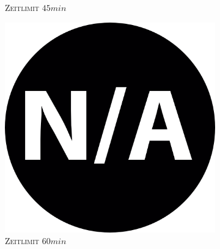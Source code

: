 \begin{figure}[H]
\begin{subfigure}[b]{0.3\textwidth}
\caption{\textsc{Zeitlimit} $45min$}
\label{fig:instance_coverage_b=3_l_b}
\end{subfigure}
\hfill
\begin{subfigure}[b]{0.3\textwidth}
\centering
\includegraphics[width=1.2\textwidth]{img/na.png}
\caption{\textsc{Zeitlimit} $60min$}
\label{fig:instance_coverage_b=3_l_c}
\end{subfigure}

\caption{}
\label{}
\end{figure}

